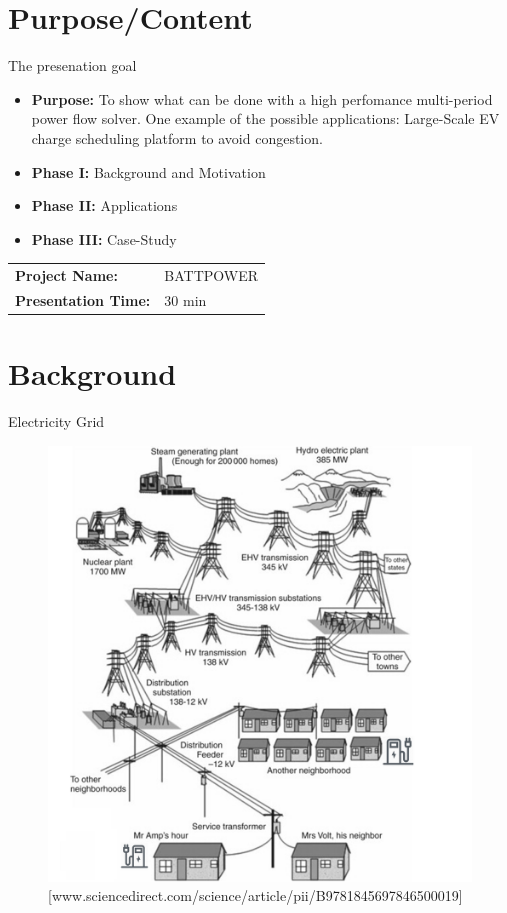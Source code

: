 \documentclass{beamer}
\begin{document}
\section{Purpose/Content}
\begin{frame}{The presenation goal}
\begin{itemize}
\item \textbf{Purpose:} To show what can be done with a high perfomance multi-period power flow solver. One example of the possible applications: Large-Scale EV charge scheduling platform to avoid congestion. 
\item \textbf{Phase I:} Background and Motivation
\item \textbf{Phase II:} Applications
\item \textbf{Phase III:} Case-Study
\end{itemize}
\begin{center}
\begin{tabular}{|l l|} 
\hline
\rowcolor{Gray} \textbf{Project Name:} &BATTPOWER \\
\textbf{Presentation Time:}& 30 min \\
\hline
\end{tabular}
\end{center}
\end{frame}

\section{Background}
\begin{frame}{Electricity Grid}
\begin{figure}[!htbp]
\centering
\includegraphics[width=2.8 in , height=2.4 in]{Figures/EVchalendge1.png}
\caption{\tiny[www.sciencedirect.com/science/article/pii/B9781845697846500019]}
\end{figure}
\end{frame}
\end{document}

